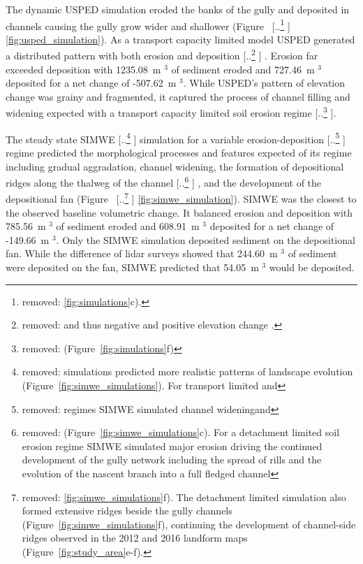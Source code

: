 \documentclass[gmd, manuscript]{copernicus}
\providecommand{\DIFadd}[1]{{\protect\color{blue} \sf #1}} %
\providecommand{\DIFdel}[1]{{\protect\color{red} [..\footnote{removed: #1} ]}} %
\providecommand{\DIFaddbegin}{} %
\providecommand{\DIFaddend}{} %
\providecommand{\DIFdelbegin}{} %
\providecommand{\DIFdelend}{} %
\begin{document}
\DIFadd{The dynamic USPED simulation
eroded the banks of the gully
and deposited in channels
causing the gully grow wider and shallower
}\DIFaddend (Figure~\DIFdelbegin \DIFdel{\ref{fig:simulations}c). 
}\DIFdelend \DIFaddbegin \DIFadd{\ref{fig:usped_simulation}). 
}\DIFaddend As a transport capacity limited model
USPED generated a distributed pattern
with both erosion and deposition\DIFdelbegin \DIFdel{and thus
negative and positive elevation change . 
}\DIFdelend \DIFaddbegin \DIFadd{.
Erosion far exceeded deposition with
1235.08~}\unit{m}\DIFadd{$^3$ of sediment eroded 
and 727.46~}\unit{m}\DIFadd{$^3$ deposited
for a net change of -507.62~}\unit{m}\DIFadd{$^3$.
}\DIFaddend While USPED's pattern of elevation change
was grainy and fragmented, 
it captured the process of channel 
filling and widening expected with 
a transport capacity limited soil erosion regime\DIFdelbegin \DIFdel{(Figure~\ref{fig:simulations}f)}\DIFdelend .

The steady state SIMWE \DIFdelbegin \DIFdel{simulations 
predicted more realistic patterns 
of landscape evolution
(Figure~\ref{fig:simwe_simulations}). 
For transport limited and
}\DIFdelend \DIFaddbegin \DIFadd{simulation
for a }\DIFaddend variable erosion-deposition \DIFdelbegin \DIFdel{regimes
SIMWE simulated
channel wideningand }\DIFdelend \DIFaddbegin \DIFadd{regime
predicted the morphological processes and features
expected of its regime including
gradual aggradation,
channel widening,
}\DIFaddend the formation of depositional ridges
along the thalweg of the channel\DIFdelbegin \DIFdel{(Figure~\ref{fig:simwe_simulations}c).
For a detachment limited soil erosion regime
SIMWE simulated major erosion
driving the continued development 
of the gully network
including the spread of rills and the evolution of the nascent branch
into a full fledged channel
}\DIFdelend \DIFaddbegin \DIFadd{,
and the development of the depositional fan
}\DIFaddend (Figure~\DIFdelbegin \DIFdel{\ref{fig:simwe_simulations}f).
The detachment limited simulation
also formed extensive ridges
beside the gully channels 
(Figure~\ref{fig:simwe_simulations}f), 
continuing the development of 
channel-side ridges
observed in the 2012 and 2016 landform maps
(Figure~\ref{fig:study_area}e-f). 
}\DIFdelend \DIFaddbegin \DIFadd{\ref{fig:simwe_simulation}).
SIMWE was the closest to the observed baseline
volumetric change.
It balanced erosion and deposition with 
785.56~}\unit{m}\DIFadd{$^3$ of sediment eroded
and 608.91~}\unit{m}\DIFadd{$^3$ deposited
for a net change of -149.66~}\unit{m}\DIFadd{$^3$.
Only the SIMWE simulation deposited sediment
on the depositional fan. 
While the difference of lidar surveys showed
that 244.60~}\unit{m}\DIFadd{$^3$ of sediment 
were deposited on the fan,
SIMWE predicted that 54.05~}\unit{m}\DIFadd{$^3$
would be deposited.
}\DIFaddend 
\end{document}
